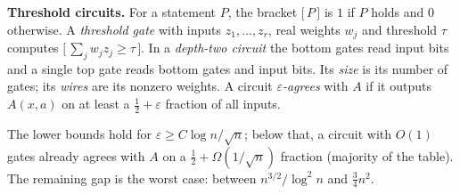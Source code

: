 \documentclass[11pt,letterpaper]{article}
\newcommand{\ind}[1]{\bigl[\,#1\,\bigr]}
\newcommand{\smalltitle}[1]{\textbf{\color{ink}#1}\quad}
\begin{document}
\smalltitle{Threshold circuits.}
For a statement $P$, the bracket $\ind{P}$ is $1$ if $P$ holds and $0$
otherwise. A \emph{threshold gate} with inputs $z_1,\dots,z_r$, real weights
$w_j$ and threshold $\tau$ computes $\ind{\sum_j w_jz_j\ge\tau}$. In a
\emph{depth-two circuit} the bottom gates read input bits and a single top
gate reads bottom gates and input bits. Its \emph{size} is its number of
gates; its \emph{wires} are its nonzero weights. A circuit
\emph{$\varepsilon$-agrees} with $A$ if it outputs $A(x,a)$ on at least a
$\tfrac12+\varepsilon$ fraction of all inputs.

The lower bounds hold for $\varepsilon\ge C\log n/\sqrt n$; below that,
a circuit with $O(1)$ gates already agrees with $A$ on a
$\tfrac12+\Omega(1/\sqrt n)$ fraction (majority of the table).
The remaining gap is the worst case: between
$n^{3/2}/\log^2n$ and $\tfrac34 n^2$.
\end{document}
